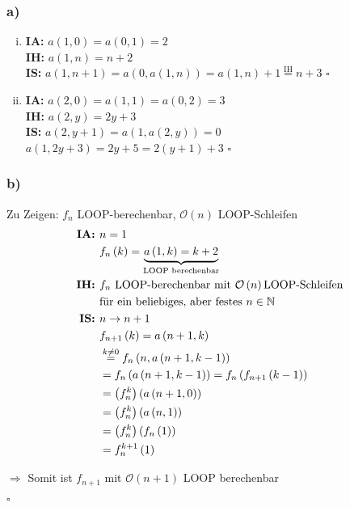 \documentclass[a4paper,12pt]{article}
\begin{document}
	\subsubsection*{a)}
	\begin{enumerate}[i)]
		\item \textbf{IA:} $a\left(1,0\right) = a\left(0,1\right) = 2$\\
			\textbf{IH:} $a\left(1,n\right) = n + 2$\\
			\textbf{IS:} $a\left(1, n+1\right) = a\left(0,a\left(1,n\right)\right) = a\left(1,n\right)+1 \overset{\text{IH}}{=} n+3$ \hfill $\square$
		\item \textbf{IA:} $a\left(2,0\right) = a\left(1,1\right) = a\left(0,2\right) = 3$\\
			\textbf{IH:} $a\left(2,y\right) = 2y+3$\\
			\textbf{IS:} $a\left(2, y+1\right) = a\left(1,a\left(2,y\right)\right) = 0$\\
			\hspace*{0.55cm} $a\left(1, 2y+3\right) = 2y+5 = 2\left(y+1\right)+3$ \hfill $\square$
	\end{enumerate}

	\subsubsection*{b)}
	Zu Zeigen: $f_n$ LOOP-berechenbar, $\mathcal{O}\left(n\right)$ LOOP-Schleifen
	\begin{align*}
		\text{\textbf{IA: }} &n = 1\\
		&f_n\left(k\right) = \underbrace{a\left(1,k\right) = k+2}_{\text{LOOP berechenbar}}\\
		\text{\textbf{IH: }} &f_n \text{ LOOP-berechenbar mit } \mathcal{O}\left(n\right) \text{LOOP-Schleifen}\\
		&\text{für ein beliebiges, aber festes } n \in \mathbb{N}\\
		\text{\textbf{IS: }} &n \rightarrow n+1\\
		&f_{n+1}\left(k\right) = a\left(n+1,k\right)\\
		&\overset{k \neq 0}{=} f_n\left(n,a\left(n+1, k-1\right)\right)\\
		&= f_n\left(a\left(n+1, k-1\right)\right) = f_n\left(f_{n+1}\left(k-1\right)\right)\\
		&=\left(f_n^k\right)\left(a\left(n+1,0\right)\right)\\
		&=\left(f_n^k\right)\left(a\left(n,1\right)\right)\\
		&=\left(f_n^k\right)\left(f_n\left(1\right)\right)\\
		&=f_n^{k+1}\left(1\right)
	\end{align*}
	\begin{center}
		$\Rightarrow$ Somit ist $f_{n+1}$ mit $\mathcal{O}\left(n+1\right)$ LOOP berechenbar
	\end{center}
 	\hfill $\square$
	
\end{document}
